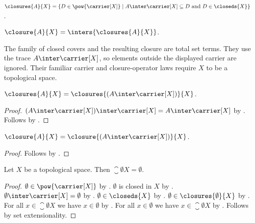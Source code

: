 \begin{definition}\label{closures}
    $\closures{A}{X} = \{ D\in\pow{\carrier[X]}\mid
        \text{$A\inter\carrier[X]\subseteq D$ and $D\in\closeds{X}$}\}$.
\end{definition}

\begin{definition}[Closure]\label{closure}
    $\closure{A}{X} = \inters{\closures{A}{X}}$.
\end{definition}

The family of closed covers and the resulting closure are total set terms.
They use the trace $A\inter\carrier[X]$, so elements outside the displayed
carrier are ignored. Their familiar carrier and closure-operator laws require
$X$ to be a topological space.

\begin{proposition}\label{closures_trace}
    $\closures{A}{X}=\closures{(A\inter\carrier[X])}{X}$.
\end{proposition}
\begin{proof}
    $(A\inter\carrier[X])\inter\carrier[X]
        =A\inter\carrier[X]$ by .
    Follows by .
\end{proof}

\begin{proposition}\label{closure_trace}
    $\closure{A}{X}=\closure{(A\inter\carrier[X])}{X}$.
\end{proposition}
\begin{proof}
    Follows by .
\end{proof}

\begin{proposition}\label{closure_emptyset}
    Let $X$ be a topological space.
    Then $\closure{\emptyset}{X} = \emptyset$.
\end{proposition}
\begin{proof}
    $\emptyset\in\pow{\carrier[X]}$ by .
    $\emptyset$ is closed in $X$ by .
    $\emptyset\inter\carrier[X]=\emptyset$
        by .
    $\emptyset\in\closeds{X}$ by .
    $\emptyset\in\closures{\emptyset}{X}$ by .
    For all $x\in\closure{\emptyset}{X}$ we have $x\in\emptyset$
        by .
    For all $x\in\emptyset$ we have $x\in\closure{\emptyset}{X}$
        by .
    Follows by set extensionality.
\end{proof}

